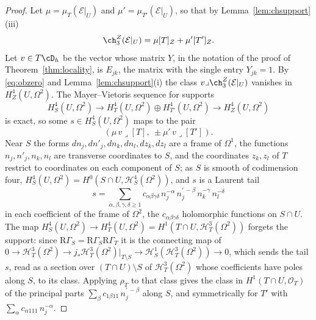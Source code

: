 \begin{proof}
Let $\mu=\mu_{T}(\mathcal{E}|_{U})$ and $\mu'=\mu_{T'}(\mathcal{E}|_{U})$, so that by Lemma~\ref{lem:chsupport}(iii)
\[
\ch^{Z}_{3}(\mathcal{E}|_{U})=\mu[T]_{Z}+\mu'[T']_{Z}.
\]
Let $v\in T\cD_{h}$ be the vector whose matrix $Y$, in the notation of the proof of Theorem~\ref{thm:locality}, is $E_{jk}$, the matrix with the single entry $Y_{jk}=1$. By \eqref{eq:obzero} and Lemma~\ref{lem:chsupport}(i) the class $v\lrcorner\ch^{Z}_{3}(\mathcal{E}|_{U})$ vanishes in $H^{4}_{Z}(U,\Omega^{2})$. The Mayer--Vietoris sequence for supports
\[
H^{4}_{S}(U,\Omega^{2})\to H^{4}_{T}(U,\Omega^{2})\oplus H^{4}_{T'}(U,\Omega^{2})\to H^{4}_{Z}(U,\Omega^{2})
\]
is exact, so some $s\in H^{4}_{S}(U,\Omega^{2})$ maps to the pair
\[
(\mu\,v\lrcorner[T],\ \pm\mu'\,v\lrcorner[T']).
\]
Near $S$ the forms $dn_{j},dn'_{j},dn_{k},dn_{l},dz_{k},dz_{l}$ are a frame of $\Omega^{1}$, the functions $n_{j},n'_{j},n_{k},n_{l}$ are transverse coordinates to $S$, and the coordinates $z_{k},z_{l}$ of $T$ restrict to coordinates on each component of $S$; as $S$ is smooth of codimension four, $H^{4}_{S}(U,\Omega^{2})=H^{0}(S\cap U,\mathcal{H}^{4}_{S}(\Omega^{2}))$, and $s$ is a Laurent tail
\[
s=\sum_{\alpha,\beta,\gamma,\delta\ge1}c_{\alpha\beta\gamma\delta}\,n_{j}^{-\alpha}\,n_{j}^{\prime\,-\beta}\,n_{k}^{-\gamma}\,n_{l}^{-\delta}
\]
in each coefficient of the frame of $\Omega^{2}$, the $c_{\alpha\beta\gamma\delta}$ holomorphic functions on $S\cap U$. The map $H^{4}_{S}(U,\Omega^{2})\to H^{4}_{T}(U,\Omega^{2})=H^{1}(T\cap U,\mathcal{H}^{3}_{T}(\Omega^{2}))$ forgets the support: since $\mathrm{R}\Gamma_{S}=\mathrm{R}\Gamma_{S}\mathrm{R}\Gamma_{T}$ it is the connecting map of $0\to\mathcal{H}^{3}_{T}(\Omega^{2})\to j_{*}\mathcal{H}^{3}_{T}(\Omega^{2})|_{T\setminus S}\to\mathcal{H}^{1}_{S}(\mathcal{H}^{3}_{T}(\Omega^{2}))\to0$, which sends the tail $s$, read as a section over $(T\cap U)\setminus S$ of $\mathcal{H}^{3}_{T}(\Omega^{2})$ whose coefficients have poles along $S$, to its class. Applying $\rho_{T}$ to that class gives the class in $H^{1}(T\cap U,\mathcal{O}_{T})$ of the principal parts $\sum_{\beta}c_{1\beta11}\,n_{j}^{\prime\,-\beta}$ along $S$, and symmetrically for $T'$ with $\sum_{\alpha}c_{\alpha111}\,n_{j}^{-\alpha}$.


\end{proof}
